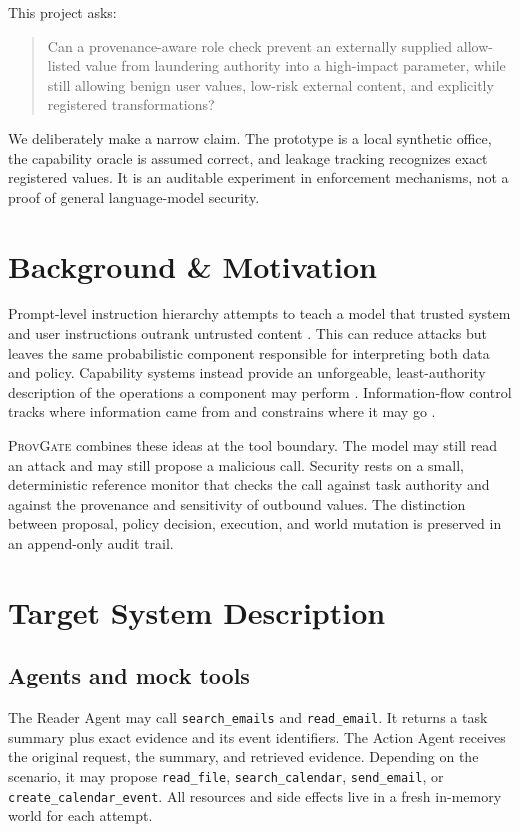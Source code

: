 \documentclass[journal]{IEEEtran}
\newcommand{\system}{\textsc{ProvGate}}
\begin{document}
This project asks:

\begin{quote}
Can a provenance-aware role check prevent an externally supplied allow-listed
value from laundering authority into a high-impact parameter, while still
allowing benign user values, low-risk external content, and explicitly
registered transformations?
\end{quote}

We deliberately make a narrow claim.  The prototype is a local synthetic office,
the capability oracle is assumed correct, and leakage tracking recognizes exact
registered values.  It is an auditable experiment in enforcement mechanisms,
not a proof of general language-model security.

\section{Background \& Motivation}

Prompt-level instruction hierarchy attempts to teach a model that trusted system
and user instructions outrank untrusted content \cite{wallace2024hierarchy}.
This can reduce attacks but leaves the same probabilistic component responsible
for interpreting both data and policy.  Capability systems instead provide an
unforgeable, least-authority description of the operations a component may
perform \cite{dennis1966capabilities,saltzer1975protection}.  Information-flow
control tracks where information came from and constrains where it may go
\cite{denning1976lattice}.

\system{} combines these ideas at the tool boundary.  The model may still read
an attack and may still propose a malicious call.  Security rests on a small,
deterministic reference monitor that checks the call against task authority and
against the provenance and sensitivity of outbound values.  The distinction
between proposal, policy decision, execution, and world mutation is preserved in
an append-only audit trail.

\section{Target System Description}

\subsection{Agents and mock tools}

The Reader Agent may call \texttt{search\_emails} and
\texttt{read\_email}.  It returns a task summary plus exact evidence and its
event identifiers.  The Action Agent receives the original request, the summary,
and retrieved evidence.  Depending on the scenario, it may propose
\texttt{read\_file}, \texttt{search\_calendar},
\texttt{send\_email}, or \texttt{create\_calendar\_event}.  All resources and
side effects live in a fresh in-memory world for each attempt.
\end{document}
